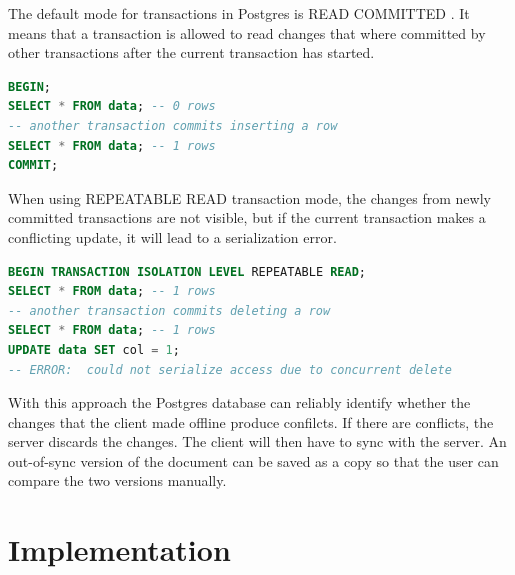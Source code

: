 \documentclass[a4paper, 11pt, oneside]{article}
\theoremstyle{definition}
\begin{document}
The default mode for transactions in Postgres is READ COMMITTED \cite{tisolevel}. It means that a transaction is allowed to read changes that where committed by other transactions after the current transaction has started. 

\begin{lstlisting}[language=SQL]
BEGIN;
SELECT * FROM data; -- 0 rows
-- another transaction commits inserting a row
SELECT * FROM data; -- 1 rows
COMMIT;
\end{lstlisting}

When using REPEATABLE READ transaction mode, the changes from newly committed transactions are not visible, but if the current transaction makes a conflicting update, it will lead to a serialization error.

\begin{lstlisting}[language=SQL]
BEGIN TRANSACTION ISOLATION LEVEL REPEATABLE READ;
SELECT * FROM data; -- 1 rows
-- another transaction commits deleting a row
SELECT * FROM data; -- 1 rows
UPDATE data SET col = 1;
-- ERROR:  could not serialize access due to concurrent delete
\end{lstlisting}

With this approach the Postgres database can reliably identify whether the changes that the client made offline produce confilcts. If there are conflicts, the server discards the changes. The client will then have to sync with the server. An out-of-sync version of the document can be saved as a copy so that the user can compare the two versions manually.

\section{Implementation}

\newpage
\printbibliography
\clearpage
\end{document}
